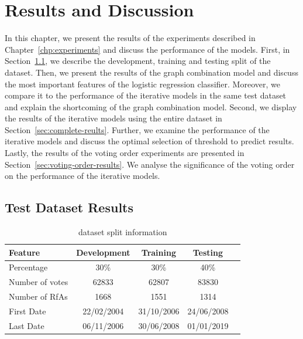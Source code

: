 \chapter{Results and Discussion} 
\label{chp:results}
In this chapter, we present the results of the experiments described in Chapter~\ref{chp:experiments} and discuss the performance of the models.
First, in Section~\ref{sec:test-data-results}, we describe the development, training and testing split of the dataset.
Then, we present the results of the graph combination model and discuss the most important features of the logistic regression classifier.
Moreover, we compare it to the performance of the iterative models in the same test dataset and explain the shortcoming of the graph combination model.
Second, we display the results of the iterative models using the entire \wikirfa dataset in Section~\ref{sec:complete-reults}.
Further, we examine the performance of the iterative models and discuss the optimal selection of threshold to predict results.
Lastly, the results of the voting order experiments are presented in Section~\ref{sec:voting-order-results}.
We analyse the significance of the voting order on the performance of the iterative models.


\section{Test Dataset Results}
\label{sec:test-data-results}

\begin{table}[htp]
    \centering
    \caption{\wikirfa dataset split information}
    \label{tab:data-splits}
    \begin{tabular}{lcccc}
        \toprule
        Feature & Development & Training & Testing \\
        \midrule

        Percentage &30\% & 30\% & 40\% \\
        Number of votes & 62833 & 62807 & 83830 \\
        Number of RfAs &1668& 1551&1314 \\
        First Date &22/02/2004 & 31/10/2006 &24/06/2008 \\
        Last Date &06/11/2006& 30/06/2008 & 01/01/2019
        \\  
        

        \bottomrule
        \end{tabular}
\end{table}

